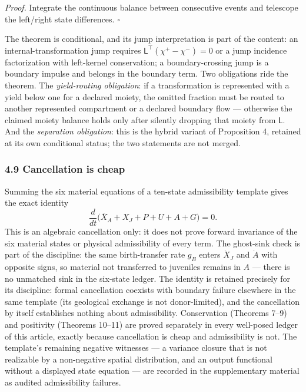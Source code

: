 \documentclass[11pt]{article}
\begin{document}
\emph{Proof.} Integrate the continuous balance between consecutive
events and telescope the left/\allowbreak{}right state differences. \ensuremath{\square}

The theorem is conditional, and its jump interpretation is part of the
content: an internal-transformation jump requires
\(\mathsf{L}^\top(\chi^+ - \chi^-) = 0\) or a jump incidence
factorization with left-kernel conservation; a boundary-crossing jump is
a boundary impulse and belongs in the boundary term. Two obligations
ride the theorem. The \emph{yield-routing obligation}: if a
transformation is represented with a yield below one for a declared
moiety, the omitted fraction must be routed to another represented
compartment or a declared boundary flow --- otherwise the claimed moiety
balance holds only after silently dropping that moiety from
\(\mathsf{L}\). And the \emph{separation obligation}: this is the hybrid
variant of Proposition 4, retained at its own conditional status; the
two statements are not merged.

\subsubsection{4.9 Cancellation is cheap}\label{cancellation-is-cheap}

Summing the six material equations of a ten-state admissibility template
gives the exact identity
\[\frac{d}{dt}\bigl( \bar X_A + X_J + P + U + A + G \bigr) = 0.\] This
is an algebraic cancellation only: it does not prove forward invariance
of the six material states or physical admissibility of every term. The
ghost-sink check is part of the discipline: the same birth-transfer rate
\(g_B\) enters \(\dot X_J\) and \(\dot A\) with opposite signs, so
material not transferred to juveniles remains in \(A\) --- there is no
unmatched sink in the six-state ledger. The identity is retained
precisely for its discipline: formal cancellation coexists with boundary
failure elsewhere in the same template (its geological exchange is not
donor-limited), and the cancellation by itself establishes nothing about
admissibility. Conservation (Theorems 7--9) and positivity (Theorems
10--11) are proved separately in every well-posed ledger of this
article, exactly because cancellation is cheap and admissibility is not.
The template's remaining negative witnesses --- a variance closure that
is not realizable by a non-negative spatial distribution, and an output
functional without a displayed state equation --- are recorded in the
supplementary material as audited admissibility failures.
\end{document}
